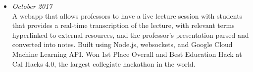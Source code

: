 \documentclass[letterpaper,8pt]{article}
\begin{document}
\begin{itemize}

\item{\small{\textbf{\href{https://devpost.com/software/megafind}{}}}}\hfill{\textit{October 2017}} \\
    \small{A webapp that allows professors to have a live lecture session with students that provides a real-time transcription of the lecture, with relevant terms hyperlinked to external resources, and the professor's presentation parsed and converted into notes. Built using Node.js, websockets, and Google Cloud Machine Learning API. Won 1st Place Overall and Best Education Hack at Cal Hacks 4.0, the largest collegiate hackathon in the world.}






\end{itemize}
\end{document}
